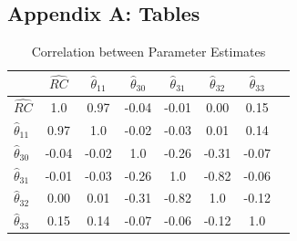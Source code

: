 

\thispagestyle{plain} %

\subsection{Appendix A: Tables} \label{appendixA}
\thispagestyle{plain} %

\begin{table}[H]
	\centering
	\caption{Correlation between Parameter Estimates}
	\label{table2}
	\begin{tabular}{l | c c c c c c c}
		\toprule\midrule
		& $\hat{RC}$ & $\hat\theta_{11}$ & $\hat\theta_{30}$ & $\hat\theta_{31}$ & $\hat\theta_{32}$ & $\hat\theta_{33}$ \\ \midrule
		$\hat{RC}$ & 1.0 & 0.97 & -0.04 & -0.01 & 0.00 & 0.15 \\
		$\hat\theta_{11}$ & 0.97 & 1.0 & -0.02 & -0.03 & 0.01 &	0.14 \\
		$\hat\theta_{30}$ &	-0.04 &	-0.02 &	1.0	& -0.26 & -0.31 & -0.07 \\
		$\hat\theta_{31}$ &	-0.01 &	-0.03 &	-0.26 &	1.0 & -0.82 & -0.06 \\
		$\hat\theta_{32}$ &	0.00 & 0.01 & -0.31 & -0.82 & 1.0 &	-0.12 \\
		$\hat\theta_{33}$ &	0.15 & 0.14 & -0.07 & -0.06 & -0.12 & 1.0 \\
		\bottomrule
	\end{tabular}
\end{table}


